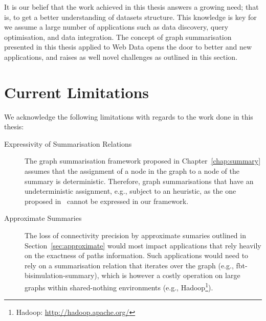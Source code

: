 It is our belief that the work achieved in this thesis answers a growing need; that is, to get a better understanding of datasets structure. This knowledge is key for we assume a large number of applications such as data discovery, query optimisation, and data integration. The concept of graph summarisation presented in this thesis applied to Web Data opens the door to better and new applications, and raises as well novel challenges as outlined in this section.

\section{Current Limitations}

We acknowledge the following limitations with regards to the work done in this thesis:
\begin{description}
	\item[Expressivity of Summarisation Relations] The graph summarisation framework proposed in Chapter~\ref{chap:summary} assumes that the assignment of a node in the graph to a node of the summary is deterministic. Therefore, graph summarisations that have an undeterministic assignment, e.g., subject to an heuristic, as the one proposed in~\cite{navlakha:2008:gsb} cannot be expressed in our framework.
	\item[Approximate Summaries] The loss of \gls{connectivity} precision by approximate sumaries outlined in Section~\ref{sec:approximate} would most impact applications that rely heavily on the exactness of paths information. Such applications would need to rely on a summarisation relation that iterates over the graph (e.g., \gls{fbt-bisimulation-summary}), which is however a costly operation on large graphs within shared-nothing environments (e.g., Hadoop\footnote{Hadoop: \url{http://hadoop.apache.org/}}).
\end{description}
